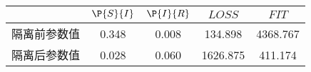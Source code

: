 \begin{tabular}{ccccc}
\hline
&$\P{S}{I}$&$\P{I}{R}$&$LOSS$&$FIT$\\
\hline
隔离前参数值&0.348&0.008&134.898&4368.767\\
隔离后参数值&0.028&0.060&1626.875&411.174\\
\hline
\end{tabular}